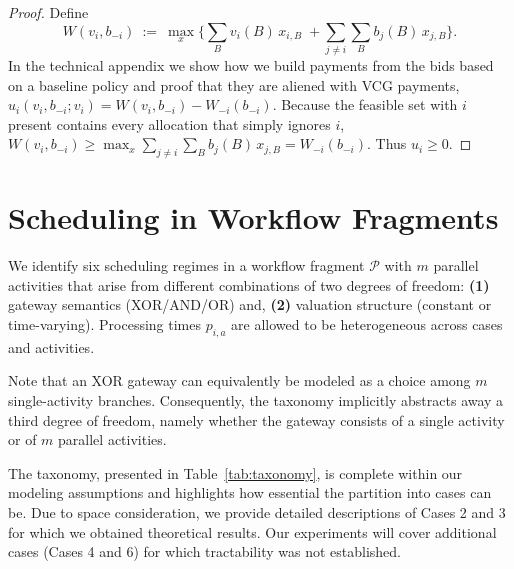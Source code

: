 \documentclass[letterpaper]{article}
\begin{document}
\begin{proof}[Proof]
Define
\[
W(v_i,b_{-i})\ :=\ \max_{x}\Bigg\{\sum_{B} v_i(B)\,x_{i,B}\;+\!\!\sum_{j\neq i}\sum_{B} b_j(B)\,x_{j,B}\Bigg\}.
\]
In the technical appendix we show how we build payments from the bids based on a baseline policy and proof that they are aliened with VCG payments, $u_i(v_i,b_{-i};v_i)=W(v_i,b_{-i})-W_{-i}(b_{-i})$.
Because the feasible set with $i$ present contains every allocation that simply ignores $i$,
$W(v_i,b_{-i})\ge \max_x \sum_{j\neq i}\sum_B b_j(B)\,x_{j,B}=W_{-i}(b_{-i})$.
Thus $u_i\ge 0$.\qedhere
\end{proof}
\fi
 



















\section{Scheduling in Workflow Fragments}
\label{sec:scheduling}


We identify six scheduling regimes 
in a workflow fragment $\mathcal{P}$ with $m$ parallel
activities that arise from different
combinations of two degrees of freedom:
\textbf{(1)} gateway semantics (XOR/AND/OR) and, 
\textbf{(2)} valuation structure (constant or time-varying).
Processing times $p_{i,a}$ are allowed to be heterogeneous across cases and activities.

Note that an XOR gateway can equivalently be modeled as a choice among $m$
single-activity branches. Consequently, the taxonomy implicitly abstracts
away a third degree of freedom, namely whether the gateway consists of a
single activity or of $m$ parallel activities. 

The taxonomy, presented in Table~\ref{tab:taxonomy}, is complete within our modeling assumptions and highlights how essential the partition into cases can be.
Due to space consideration, we provide detailed descriptions of Cases 2 and 3 for which we obtained theoretical results.
Our experiments will cover additional cases (Cases 4 and 6) for which tractability was not established. 
\end{document}
